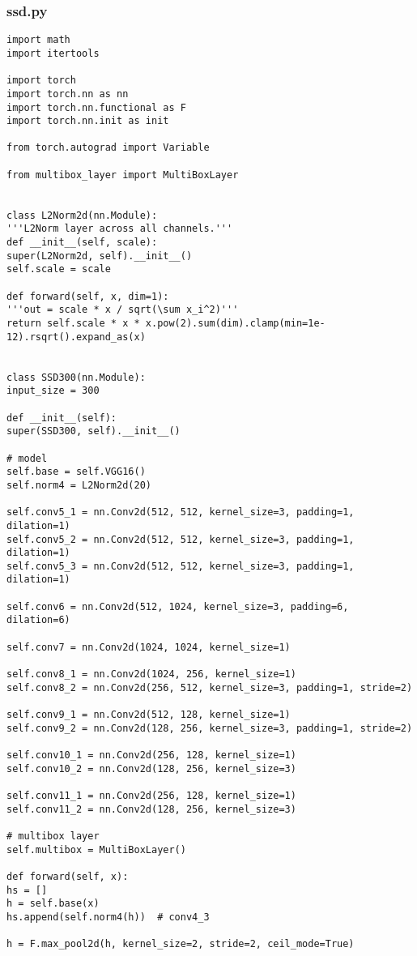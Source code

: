 \subsubsection*{ssd.py}
\begin{lstlisting}
import math
import itertools

import torch
import torch.nn as nn
import torch.nn.functional as F
import torch.nn.init as init

from torch.autograd import Variable

from multibox_layer import MultiBoxLayer


class L2Norm2d(nn.Module):
'''L2Norm layer across all channels.'''
def __init__(self, scale):
super(L2Norm2d, self).__init__()
self.scale = scale

def forward(self, x, dim=1):
'''out = scale * x / sqrt(\sum x_i^2)'''
return self.scale * x * x.pow(2).sum(dim).clamp(min=1e-12).rsqrt().expand_as(x)


class SSD300(nn.Module):
input_size = 300

def __init__(self):
super(SSD300, self).__init__()

# model
self.base = self.VGG16()
self.norm4 = L2Norm2d(20)

self.conv5_1 = nn.Conv2d(512, 512, kernel_size=3, padding=1, dilation=1)
self.conv5_2 = nn.Conv2d(512, 512, kernel_size=3, padding=1, dilation=1)
self.conv5_3 = nn.Conv2d(512, 512, kernel_size=3, padding=1, dilation=1)

self.conv6 = nn.Conv2d(512, 1024, kernel_size=3, padding=6, dilation=6)

self.conv7 = nn.Conv2d(1024, 1024, kernel_size=1)

self.conv8_1 = nn.Conv2d(1024, 256, kernel_size=1)
self.conv8_2 = nn.Conv2d(256, 512, kernel_size=3, padding=1, stride=2)

self.conv9_1 = nn.Conv2d(512, 128, kernel_size=1)
self.conv9_2 = nn.Conv2d(128, 256, kernel_size=3, padding=1, stride=2)

self.conv10_1 = nn.Conv2d(256, 128, kernel_size=1)
self.conv10_2 = nn.Conv2d(128, 256, kernel_size=3)

self.conv11_1 = nn.Conv2d(256, 128, kernel_size=1)
self.conv11_2 = nn.Conv2d(128, 256, kernel_size=3)

# multibox layer
self.multibox = MultiBoxLayer()

def forward(self, x):
hs = []
h = self.base(x)
hs.append(self.norm4(h))  # conv4_3

h = F.max_pool2d(h, kernel_size=2, stride=2, ceil_mode=True)


\end{lstlisting}
